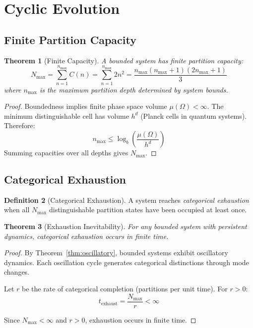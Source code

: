 \documentclass[twocolumn,10pt,a4paper]{article}
\newtheorem{theorem}{Theorem}[section]
\theoremstyle{definition}
\newtheorem{definition}[theorem]{Definition}
\theoremstyle{remark}
\newcommand{\Nmax}{N_{\mathrm{max}}}
\begin{document}
\section{Cyclic Evolution}
\label{sec:cyclic}

\subsection{Finite Partition Capacity}

\begin{theorem}[Finite Capacity]
\label{thm:finite}
A bounded system has finite partition capacity:
\begin{equation}
    \Nmax = \sum_{n=1}^{n_{\max}} C(n) = \sum_{n=1}^{n_{\max}} 2n^2 = \frac{n_{\max}(n_{\max}+1)(2n_{\max}+1)}{3}
\end{equation}
where $n_{\max}$ is the maximum partition depth determined by system bounds.
\end{theorem}

\begin{proof}
Boundedness implies finite phase space volume $\mu(\Omega) < \infty$. The minimum distinguishable cell has volume $h^d$ (Planck cells in quantum systems). Therefore:
\begin{equation}
    n_{\max} \leq \log_b\left(\frac{\mu(\Omega)}{h^d}\right)
\end{equation}
Summing capacities over all depths gives $\Nmax$.
\end{proof}

\subsection{Categorical Exhaustion}

\begin{definition}[Categorical Exhaustion]
\label{def:exhaustion}
A system reaches \emph{categorical exhaustion} when all $\Nmax$ distinguishable partition states have been occupied at least once.
\end{definition}

\begin{theorem}[Exhaustion Inevitability]
\label{thm:exhaustion}
For any bounded system with persistent dynamics, categorical exhaustion occurs in finite time.
\end{theorem}

\begin{proof}
By Theorem~\ref{thm:oscillatory}, bounded systems exhibit oscillatory dynamics. Each oscillation cycle generates categorical distinctions through mode changes.

Let $r$ be the rate of categorical completion (partitions per unit time). For $r > 0$:
\begin{equation}
    t_{\text{exhaust}} = \frac{\Nmax}{r} < \infty
\end{equation}

Since $\Nmax < \infty$ and $r > 0$, exhaustion occurs in finite time.
\end{proof}
\end{document}
